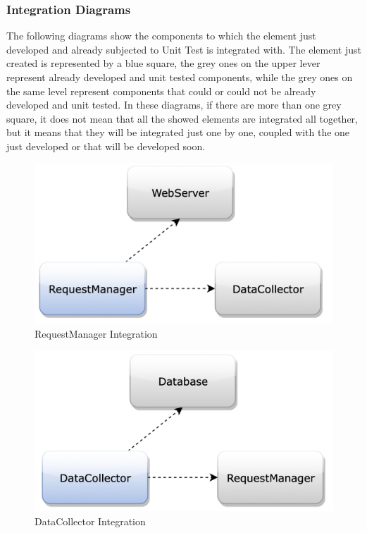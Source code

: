 \subsubsection{Integration Diagrams}
The following diagrams show the components to which the element just developed and already subjected to Unit Test is integrated with. The element just created is represented by a blue square, the grey ones on the upper lever represent already developed and unit tested components, while the grey ones on the same level represent components that could or could not be already developed and unit tested. In these diagrams, if there are more than one grey square, it does not mean that all the showed elements are integrated all together, but it means that they will be integrated just one by one, coupled with the one just developed or that will be developed soon.

\begin{figure}[H]
\centering
\includegraphics[scale=0.35]{Images/IntegrationPlanImages/fig1.png}
\caption{RequestManager Integration}
\end{figure}

\begin{figure}[H]
\centering
\includegraphics[scale=0.35]{Images/IntegrationPlanImages/fig2.png}
\caption{DataCollector Integration}
\end{figure}

